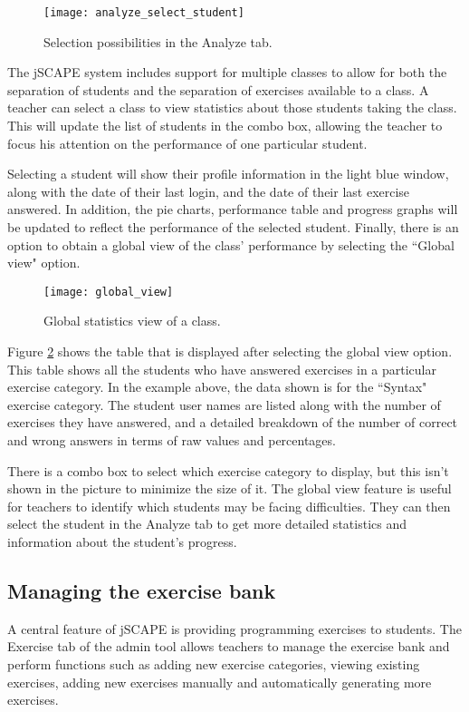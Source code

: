 \begin{figure}[H]
\centering
\texttt{[image: analyze\_select\_student]}
\caption{Selection possibilities in the Analyze tab.}
\label{fig:analyze_select_student}
\end{figure}

The jSCAPE system includes support for multiple classes to allow for both the separation of students and the separation of exercises available to a class. A teacher can select a class to view statistics about those students taking the class. This will update the list of students in the combo box, allowing the teacher to focus his attention on the performance of one particular student. \newline

Selecting a student will show their profile information in the light blue window, along with the date of their last login, and the date of their last exercise answered. In addition, the pie charts, performance table and progress graphs will be updated to reflect the performance of the selected student. Finally, there is an option to obtain a global view of the class' performance by selecting the ``Global view" option. 

\begin{figure}[H]
\centering
\texttt{[image: global\_view]}
\caption{Global statistics view of a class.}
\label{fig:global_view}
\end{figure}

Figure \ref{fig:global_view} shows the table that is displayed after selecting the global view option. This table shows all the students who have answered exercises in a particular exercise category. In the example above, the data shown is for the ``Syntax" exercise category. The student user names are listed along with the number of exercises they have answered, and a detailed breakdown of the number of correct and wrong answers in terms of raw values and percentages. \newline

There is a combo box to select which exercise category to display, but this isn't shown in the picture to minimize the size of it. The global view feature is useful for teachers to identify which students may be facing difficulties. They can then select the student in the Analyze tab to get more detailed statistics and information about the student's progress.

\subsection{Managing the exercise bank}
A central feature of jSCAPE is providing programming exercises to students. The Exercise tab of the admin tool allows teachers to manage the exercise bank and perform functions such as adding new exercise categories, viewing existing exercises, adding new exercises manually and automatically generating more exercises.

